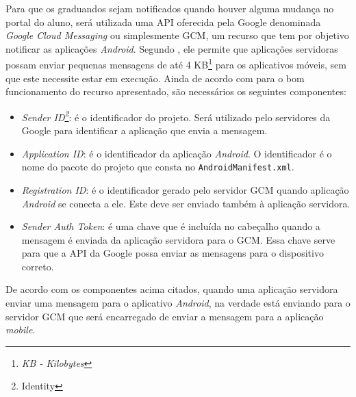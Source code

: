 
	\par Para que os graduandos sejam notificados quando houver alguma mudança no
portal do aluno, será utilizada uma API oferecida pela Google denominada
\textit{Google Cloud Messaging} ou simplesmente GCM, um recurso que tem por
objetivo notificar as aplicações \textit{Android}. Segundo , ele
permite que aplicações servidoras possam enviar pequenas mensagens de até 4
KB\footnote{\textit{KB - Kilobytes}} para os aplicativos móveis, sem que este
necessite estar em execução. Ainda de acordo com  para o
bom funcionamento do recurso apresentado, são necessários os seguintes
componentes:

\begin{itemize}
	
	\item \textit{Sender ID\footnote{Identity}}: é o identificador do projeto.
	Será utilizado pelo servidores da Google para identificar a aplicação
	que envia a mensagem.
	
	\item \textit{Application ID}: é o identificador da aplicação \textit{Android}. O
	identificador é o nome do pacote do projeto que consta no
	\texttt{AndroidManifest.xml}.
	
	\item \textit{Registration ID}: é o identificador gerado pelo servidor GCM
	quando aplicação \textit{Android} se conecta a ele. Este deve ser enviado
	também à aplicação servidora.
	
	\item \textit{Sender Auth Token}: é uma chave que é incluída no cabeçalho
	quando a mensagem é enviada da aplicação servidora para o GCM. Essa chave serve
	para que a API da Google possa enviar as mensagens para o dispositivo
	correto.

\end{itemize}

	\par De acordo com os componentes acima citados, quando uma aplicação servidora
enviar uma mensagem para o aplicativo \textit{Android}, na verdade está
enviando para o servidor GCM que será encarregado de enviar a mensagem para a aplicação
\textit{mobile}.
